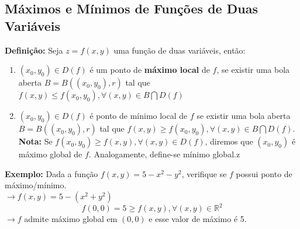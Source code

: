 \documentclass{article}
\begin{document}
	\subsection{Máximos e Mínimos de Funções de Duas Variáveis}
		\textbf{Definição:} Seja $z=f(x,y)$ uma função de duas variáveis, então:
		\begin{enumerate}
			\item $(x_0,y_0) \in D(f)$ é um ponto de \textbf{máximo local} de $f$, se existir uma bola aberta $B = B((x_0,y_0),r)$ tal que $f(x,y) \leq f(x_0,y_0) , \forall (x,y) \in B \bigcap D(f)$
			\item $(x_0,y_0) \in D(f)$ é ponto de mínimo local de $f$ se existir uma bola aberta $B=B((x_0,y_0),r)$ tal que $f(x,y) \geq f(x_0,y_0), \forall (x,y) \in B \bigcap D(f)$.\\
			\textbf{Nota:} Se $f(x_0,y_0) \geq f(x,y), \forall (x,y) \in D(f)$, diremos que $(x_0,y_0)$ é máximo global de $f$. Analogamente, define-se mínimo global.z
		\end{enumerate}
		\textbf{Exemplo:} Dada a função $f(x,y) = 5-x^2-y^2$, verifique se $f$ possui ponto de máximo/mínimo.\\
		$\to f(x,y) = 5 - (x^2+y^2)$
		$$f(0,0) = 5 \geq f(x,y), \forall (x,y) \in \mathbb{R}^2$$
		$\to f$ admite máximo global em $(0,0)$ e esse valor de máximo é 5.
\end{document}
